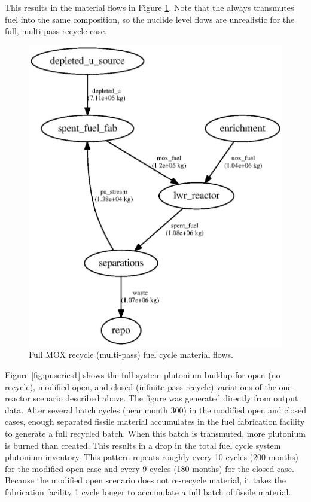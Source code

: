 This results in the material flows in Figure \ref{fig:flowclosed}. Note
that the  always transmutes fuel into the same
composition, so the nuclide level flows are unrealistic for the full, 
multi-pass
recycle case.

\begin{figure}[H]
\begin{center}
\includegraphics{./images/flow-closed-1.eps}
\end{center}
\caption{Full \gls{MOX} recycle (multi-pass) fuel cycle material flows.}
\label{fig:flowclosed}
\end{figure}

Figure \ref{fig:puseries1} shows the full-system plutonium buildup for open
(no recycle), modified open, and closed (infinite-pass recycle) variations of
the one-reactor scenario described above. The figure was
generated directly from \Cyclus output data. After several batch cycles (near
month 300) in the modified open and closed cases, enough separated fissile
material accumulates in the fuel fabrication facility to generate a full
recycled batch.  When this batch is transmuted, more plutonium is burned than
created.  This results in a drop in the total fuel cycle system plutonium
inventory.  This pattern repeats roughly every 10 cycles (200 months) for the
modified open case and every 9 cycles (180 months) for the closed case.
Because the modified open scenario does not re-recycle material, it takes the
fabrication facility 1 cycle longer to accumulate a full batch of
fissile material.

